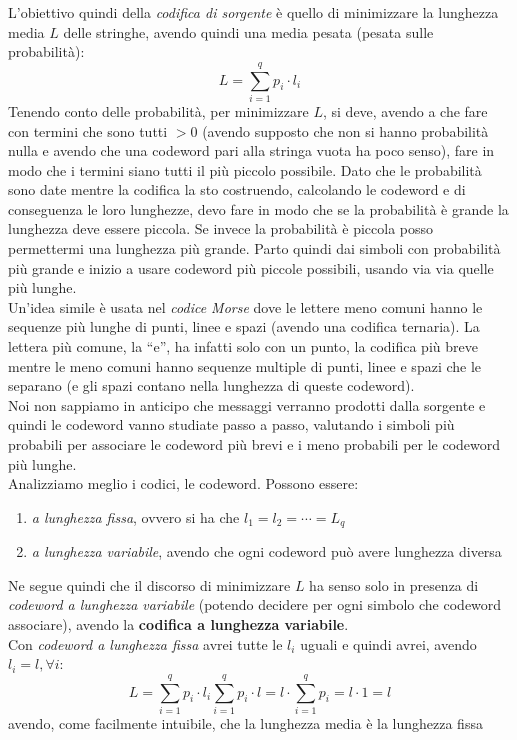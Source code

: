\documentclass[a4paper,12pt, oneside]{book}
\begin{document}
L'obiettivo quindi della \textit{codifica di sorgente} è quello di minimizzare
la lunghezza media $L$ delle stringhe, avendo quindi una media pesata (pesata
sulle probabilità):
\[L=\sum_{i=1}^q p_i\cdot l_i\]
Tenendo conto delle probabilità, per minimizzare $L$, si deve, avendo a che fare
con termini che sono tutti $>0$ (avendo supposto che non si hanno probabilità
nulla e avendo che una codeword pari alla stringa vuota ha poco senso), fare in
modo che i termini siano tutti il più piccolo possibile. Dato che le probabilità
sono date mentre la codifica la sto costruendo, calcolando le codeword e di
conseguenza le loro lunghezze, devo fare in modo che se la probabilità è grande
la lunghezza deve essere piccola. Se invece la probabilità è piccola posso
permettermi una lunghezza più grande. Parto quindi dai simboli con probabilità
più grande e inizio a usare codeword più piccole possibili, usando via via
quelle più lunghe. \\
Un'idea simile è usata nel \textit{codice Morse} dove le
lettere meno comuni hanno le sequenze più lunghe di punti, linee e spazi (avendo
una codifica ternaria). La lettera più comune, la ``e'', ha infatti solo con un
punto, la codifica più breve mentre le meno comuni hanno sequenze multiple di
punti, linee e spazi che le separano (e gli spazi contano nella lunghezza di
queste codeword).\\
Noi non sappiamo in anticipo che messaggi verranno prodotti dalla sorgente e
quindi le codeword vanno studiate passo a passo, valutando i simboli più
probabili per associare le codeword più brevi e i meno probabili per le
codeword più lunghe.\\
Analizziamo meglio i codici, le codeword. Possono essere:
\begin{enumerate}
  \item \textit{a lunghezza fissa}, ovvero si ha che $l_1=l_2=\cdots=L_q$
  \item \textit{a lunghezza variabile}, avendo che ogni codeword può avere
  lunghezza diversa
\end{enumerate}
Ne segue quindi che il discorso di minimizzare $L$ ha senso solo in presenza di
\textit{codeword a lunghezza variabile} (potendo decidere per ogni simbolo che
codeword associare), avendo la \textbf{codifica a lunghezza variabile}.\\
Con \textit{codeword a lunghezza fissa} avrei tutte le $l_i$ uguali e quindi
avrei, avendo $l_i=l,\forall i$:
\[L=\sum_{i=1}^q p_i\cdot l_i \sum_{i=1}^q p_i\cdot l =l\cdot\sum_{i=1}^q
  p_i=l\cdot 1 = l\]
avendo, come facilmente intuibile, che la lunghezza media è la lunghezza fissa
\end{document}
